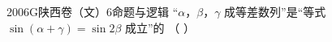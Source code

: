 
\begin{problem}{2006}{G}{陕西卷（文）}{6}{命题与逻辑}
“$ \alpha $，$ \beta $，$ \gamma $ 成等差数列”是“等式 $ \sin(\alpha + \gamma) = \sin 2\beta $ 成立”的 （ ）
\begin{choices}
\end{choices}
\end{problem}

\begin{answer}

\end{answer}

\begin{solutions}

\end{solutions}